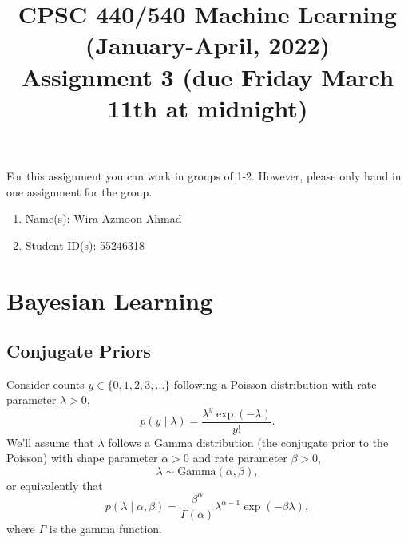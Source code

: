 \documentclass{article}
\def\blu#1{{\color{blu}#1}}
\def\cond{\; | \;}
\def\enum#1{\begin{enumerate}#1\end{enumerate}}
\begin{document}
\title{CPSC 440/540 Machine Learning (January-April, 2022)\\Assignment 3 (due Friday March 11th at midnight)}
\author{}
\date{}
\maketitle
\vspace{-4em}

For this assignment you can work in groups of 1-2. However, please only hand in one assignment for the group.


\blu{\enum{
\item Name(s): Wira Azmoon Ahmad
\item Student ID(s): 55246318
}}


\section{Bayesian Learning}


\subsection{Conjugate Priors}

Consider counts $y \in \{0,1,2,3,\dots\}$ following a Poisson distribution with rate parameter $\lambda > 0$,
\[
p(y \cond \lambda) = \frac{\lambda^y\exp(-\lambda)}{y!}.
\]
We'll assume that $\lambda$ follows a Gamma distribution (the conjugate prior to the Poisson) with shape parameter $\alpha > 0$ and rate parameter $\beta > 0$,
\[
\lambda \sim \text{Gamma}(\alpha, \beta),
\]
or equivalently that
\[
p(\lambda \cond \alpha, \beta) = \frac{\beta^\alpha}{\Gamma(\alpha)}\lambda^{\alpha-1}\exp(-\beta\lambda),
\]
where $\Gamma$ is the gamma function.
\end{document}
